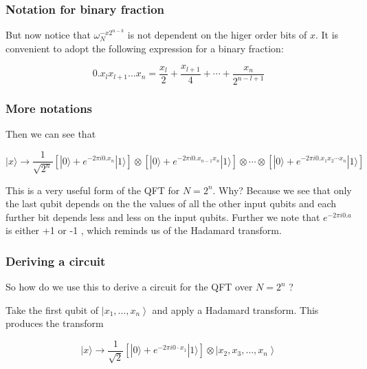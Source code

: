 \documentclass{beamer}
\begin{document}
\begin{frame}
\frametitle{Notation for binary fraction}

But now notice that $\omega_{N}^{-x 2^{n-k}}$ is not dependent on the
higer order bits of $x$. It is convenient to adopt the following
expression for a binary fraction:

\begin{equation*}
0 . x_{l} x_{l+1} \ldots x_{n}=\frac{x_{l}}{2}+\frac{x_{l+1}}{4}+\cdots+\frac{x_{n}}{2^{n-l+1}}
\end{equation*}
\end{frame}

\begin{frame}
\frametitle{More notations}

Then we can see that

\begin{equation*}
|x\rangle \rightarrow \frac{1}{\sqrt{2^{n}}}\left[|0\rangle+e^{-2 \pi i 0 . x_{n}}|1\rangle\right] \otimes\left[|0\rangle+e^{-2 \pi i 0 . x_{n-1} x_{n}}|1\rangle\right] \otimes \cdots \otimes\left[|0\rangle+e^{-2 \pi i 0 . x_{1} x_{2} \cdots x_{n}}|1\rangle\right] 
\end{equation*}

This is a very useful form of the QFT for $N=2^{n}$. Why? Because we
see that only the last qubit depends on the the values of all the
other input qubits and each further bit depends less and less on the
input qubits. Further we note that $e^{-2 \pi i 0 . a}$ is either +1
or -1 , which reminds us of the Hadamard transform.
\end{frame}

\begin{frame}
\frametitle{Deriving a circuit}

So how do we use this to derive a circuit for the QFT over $N=2^{n}$ ?

Take the first qubit of $\left|x_{1}, \ldots, x_{n}\right\rangle$ and
apply a Hadamard transform. This produces the transform

\begin{equation*}
|x\rangle \rightarrow \frac{1}{\sqrt{2}}\left[|0\rangle+e^{-2 \pi i 0 \cdot x_{1}}|1\rangle\right] \otimes\left|x_{2}, x_{3}, \ldots, x_{n}\right\rangle 
\end{equation*}
\end{frame}
\end{document}
